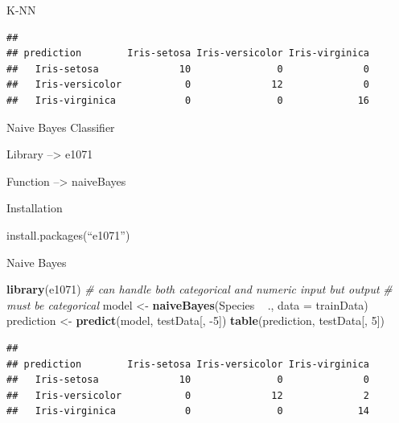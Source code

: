 \documentclass[ignorenonframetext,]{beamer}
\newenvironment{Shaded}{\begin{snugshade}}{\end{snugshade}}
\newcommand{\KeywordTok}[1]{\textcolor[rgb]{0.13,0.29,0.53}{\textbf{{#1}}}}
\newcommand{\DataTypeTok}[1]{\textcolor[rgb]{0.13,0.29,0.53}{{#1}}}
\newcommand{\DecValTok}[1]{\textcolor[rgb]{0.00,0.00,0.81}{{#1}}}
\newcommand{\StringTok}[1]{\textcolor[rgb]{0.31,0.60,0.02}{{#1}}}
\newcommand{\CommentTok}[1]{\textcolor[rgb]{0.56,0.35,0.01}{\textit{{#1}}}}
\newcommand{\NormalTok}[1]{{#1}}
\begin{document}
\begin{frame}[fragile]{K-NN}

\begin{Shaded}
\end{Shaded}

\begin{verbatim}
##                  
## prediction        Iris-setosa Iris-versicolor Iris-virginica
##   Iris-setosa              10               0              0
##   Iris-versicolor           0              12              0
##   Iris-virginica            0               0             16
\end{verbatim}

\end{frame}

\begin{frame}{Naive Bayes Classifier}

Library --\textgreater{} e1071

Function --\textgreater{} naiveBayes

Installation

install.packages(``e1071'')

\end{frame}

\begin{frame}[fragile]{Naive Bayes}

\begin{Shaded}
\begin{Highlighting}[]
\KeywordTok{library}\NormalTok{(e1071)}
\CommentTok{# can handle both categorical and numeric input but output}
\CommentTok{# must be categorical}
\NormalTok{model <-}\StringTok{ }\KeywordTok{naiveBayes}\NormalTok{(Species ~}\StringTok{ }\NormalTok{., }\DataTypeTok{data =} \NormalTok{trainData)}
\NormalTok{prediction <-}\StringTok{ }\KeywordTok{predict}\NormalTok{(model, testData[, -}\DecValTok{5}\NormalTok{])}
\KeywordTok{table}\NormalTok{(prediction, testData[, }\DecValTok{5}\NormalTok{])}
\end{Highlighting}
\end{Shaded}

\begin{verbatim}
##                  
## prediction        Iris-setosa Iris-versicolor Iris-virginica
##   Iris-setosa              10               0              0
##   Iris-versicolor           0              12              2
##   Iris-virginica            0               0             14
\end{verbatim}

\end{frame}
\end{document}
